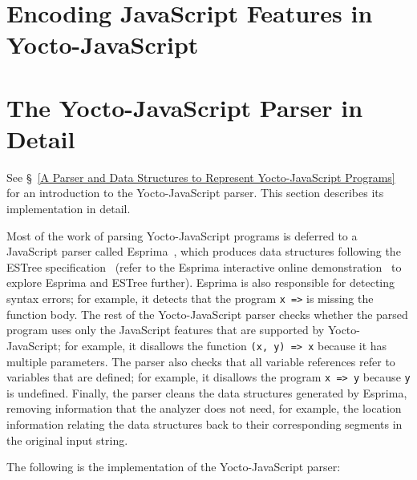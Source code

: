 \documentclass[12pt, oneside]{book}
\begin{document}

\appendix

\chapter{Encoding JavaScript Features in Yocto-JavaScript}
\label{Encoding JavaScript Features in Yocto-JavaScript}


\chapter{The Yocto-JavaScript Parser in Detail}
\label{The Yocto-JavaScript Parser in Detail}

See §~\ref{A Parser and Data Structures to Represent Yocto-JavaScript Programs} for an introduction to the Yocto-JavaScript parser. This section describes its implementation in detail.

Most of the work of parsing Yocto-JavaScript programs is deferred to a JavaScript parser called Esprima~\cite{esprima}, which produces data structures following the ESTree specification~\cite{estree} (refer to the Esprima interactive online demonstration~\cite{esprima-demonstration} to explore Esprima and ESTree further). Esprima is also responsible for detecting syntax errors; for example, it detects that the program \texttt{x =>} is missing the function body. The rest of the Yocto-JavaScript parser checks whether the parsed program uses only the JavaScript features that are supported by Yocto-JavaScript; for example, it disallows the function \texttt{(x, y) => x} because it has multiple parameters. The parser also checks that all variable references refer to variables that are defined; for example, it disallows the program \texttt{x => y} because \texttt{y} is undefined. Finally, the parser cleans the data structures generated by Esprima, removing information that the analyzer does not need, for example, the location information relating the data structures back to their corresponding segments in the original input string.

The following is the implementation of the Yocto-JavaScript parser:
\end{document}
